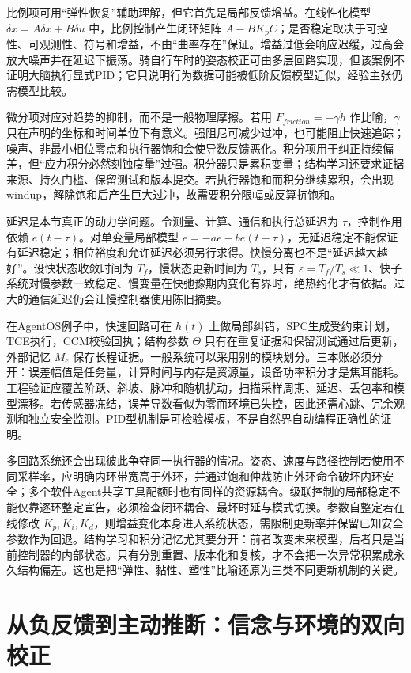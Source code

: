 比例项可用“弹性恢复”辅助理解，但它首先是局部反馈增益。在线性化模型 $\delta\dot x=A\delta x+B\delta u$ 中，比例控制产生闭环矩阵 $A-BK_pC$；是否稳定取决于可控性、可观测性、符号和增益，不由“曲率存在”保证。增益过低会响应迟缓，过高会放大噪声并在延迟下振荡。骑自行车时的姿态校正可由多层回路实现，但该案例不证明大脑执行显式PID；它只说明行为数据可能被低阶反馈模型近似，经验主张仍需模型比较。

微分项对应对趋势的抑制，而不是一般物理摩擦。若用 $F_{friction}=-\gamma\dot h$ 作比喻，$\gamma$只在声明的坐标和时间单位下有意义。强阻尼可减少过冲，也可能阻止快速追踪；噪声、非最小相位零点和执行器饱和会使导数反馈恶化。积分项用于纠正持续偏差，但“应力积分必然刻蚀度量”过强。积分器只是累积变量；结构学习还要求证据来源、持久门槛、保留测试和版本提交。若执行器饱和而积分继续累积，会出现windup，解除饱和后产生巨大过冲，故需要积分限幅或反算抗饱和。

延迟是本节真正的动力学问题。令测量、计算、通信和执行总延迟为 $\tau$，控制作用依赖 $e(t-\tau)$。对单变量局部模型 $\dot e=-ae-be(t-\tau)$，无延迟稳定不能保证有延迟稳定；相位裕度和允许延迟必须另行求得。快慢分离也不是“延迟越大越好”。设快状态收敛时间为 $T_f$，慢状态更新时间为 $T_s$，只有 $\varepsilon=T_f/T_s\ll1$、快子系统对慢参数一致稳定、慢变量在快弛豫期内变化有界时，绝热约化才有依据。过大的通信延迟仍会让慢控制器使用陈旧摘要。

在AgentOS例子中，快速回路可在 $h(t)$ 上做局部纠错，SPC生成受约束计划，TCE执行，CCM校验回执；结构参数 $\Theta$ 只有在重复证据和保留测试通过后更新，外部记忆 $M_e$ 保存长程证据。一般系统可以采用别的模块划分。三本账必须分开：误差幅值是任务量，计算时间与内存是资源量，设备功率积分才是焦耳能耗。工程验证应覆盖阶跃、斜坡、脉冲和随机扰动，扫描采样周期、延迟、丢包率和模型漂移。若传感器冻结，误差导数看似为零而环境已失控，因此还需心跳、冗余观测和独立安全监测。PID型机制是可检验模板，不是自然界自动编程正确性的证明。

多回路系统还会出现彼此争夺同一执行器的情况。姿态、速度与路径控制若使用不同采样率，应明确内环带宽高于外环，并通过饱和仲裁防止外环命令破坏内环安全；多个软件Agent共享工具配额时也有同样的资源耦合。级联控制的局部稳定不能仅靠逐环整定宣告，必须检查闭环耦合、最坏时延与模式切换。参数自整定若在线修改 $K_p,K_i,K_d$，则增益变化本身进入系统状态，需限制更新率并保留已知安全参数作为回退。结构学习和积分记忆尤其要分开：前者改变未来模型，后者只是当前控制器的内部状态。只有分别重置、版本化和复核，才不会把一次异常积累成永久结构偏差。这也是把“弹性、黏性、塑性”比喻还原为三类不同更新机制的关键。

\section{从负反馈到主动推断：信念与环境的双向校正}
\label{sec:active_inference_manifold}

